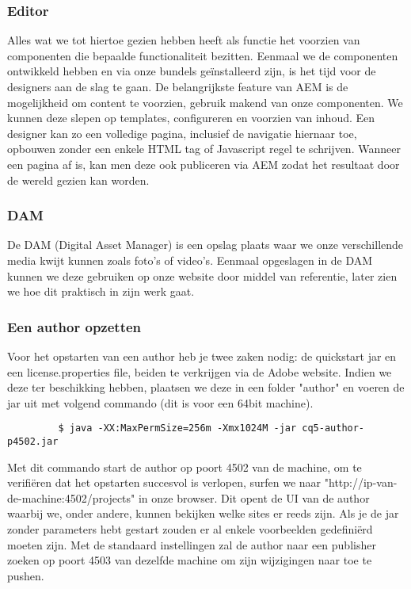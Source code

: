 \documentclass{article}
\begin{document}
	\subsubsection{Editor}
	Alles wat we tot hiertoe gezien hebben heeft als functie het voorzien van componenten die bepaalde functionaliteit bezitten. Eenmaal we de componenten ontwikkeld hebben en via onze bundels ge\"installeerd zijn, is het tijd voor de designers aan de slag te gaan. De belangrijkste feature van AEM is de mogelijkheid om content te voorzien, gebruik makend van onze componenten. We kunnen deze slepen op templates, configureren en voorzien van inhoud. Een designer kan zo een volledige pagina, inclusief de navigatie hiernaar toe, opbouwen zonder een enkele HTML tag of Javascript regel te schrijven. Wanneer een pagina af is, kan men deze ook publiceren via AEM zodat het resultaat door de wereld gezien kan worden.
	\subsubsection{DAM}
	De DAM (Digital Asset Manager) is een opslag plaats waar we onze verschillende media kwijt kunnen zoals foto's of video's. Eenmaal opgeslagen in de DAM kunnen we deze gebruiken op onze website door middel van referentie, later zien we hoe dit praktisch in zijn werk gaat.
	\subsubsection{Een author opzetten}
	Voor het opstarten van een author heb je twee zaken nodig: de quickstart jar en een license.properties file, beiden te verkrijgen via de Adobe website. Indien we deze ter beschikking hebben, plaatsen we deze in een folder "author" en voeren de jar uit met volgend commando (dit is voor een 64bit machine).
	\begin{lstlisting}
		 $ java -XX:MaxPermSize=256m -Xmx1024M -jar cq5-author-p4502.jar
	\end{lstlisting}	
	\par
	Met dit commando start de author op poort 4502 van de machine, om te verifi\"eren dat het opstarten succesvol is verlopen, surfen we naar "http://ip-van-de-machine:4502/projects" in onze browser. Dit opent de UI van de author waarbij we, onder andere, kunnen bekijken welke sites er reeds zijn. Als je de jar zonder parameters hebt gestart zouden er al enkele voorbeelden gedefini\"erd moeten zijn. Met de standaard instellingen zal de author naar een publisher zoeken op poort 4503 van dezelfde machine om zijn wijzigingen naar toe te pushen.
\end{document}
